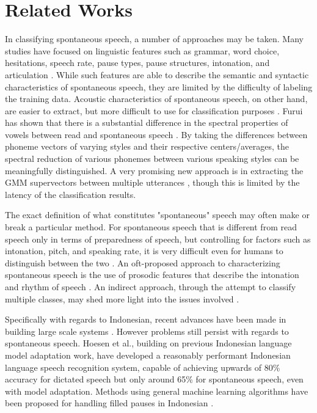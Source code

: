 \documentclass[conference]{IEEEtran}
\begin{document}
\section{Related Works}

In classifying spontaneous speech, a number of approaches may be taken.
Many studies have focused on linguistic features such as grammar, word choice, hesitations, speech rate, pause types, pause structures, intonation, and articulation \cite{barik}\cite{blaauw}\cite{umeda}.
While such features are able to describe the semantic and syntactic characteristics of spontaneous speech, they are limited by the difficulty of labeling the training data.
Acoustic characteristics of spontaneous speech, on other hand, are easier to extract, but more difficult to use for classification purposes \cite{nakamura}.
Furui has shown that there is a substantial difference in the spectral properties of vowels between read and spontaneous speech \cite{furui1}.
By taking the differences between phoneme vectors of varying styles and their respective centers/averages, the spectral reduction of various phonemes between various speaking styles can be meaningfully distinguished.
A very promising new approach is in extracting the GMM supervectors between multiple utterances \cite{asami}, though this is limited by the latency of the classification results.

The exact definition of what constitutes "spontaneous" speech may often make or break a particular method.
For spontaneous speech that is different from read speech only in terms of preparedness of speech, but controlling for factors such as intonation, pitch, and speaking rate, it is very difficult even for humans to distinguish between the two \cite{laan}.
An oft-proposed approach to characterizing spontaneous speech is the use of prosodic features that describe the intonation and rhythm of speech \cite{silverman}.
An indirect approach, through the attempt to classify multiple classes, may shed more light into the issues involved \cite{liu}.

Specifically with regards to Indonesian, recent advances have been made in building large scale systems \cite{lestari}\cite{sakti}.
However problems still persist with regards to spontaneous speech.
Hoesen et al., building on previous Indonesian language model adaptation work\cite{lestari2}, have developed a reasonably performant Indonesian language speech recognition system, capable of achieving upwards of 80\% accuracy for dictated speech but only around 65\% for spontaneous speech, even with model adaptation.
Methods using general machine learning algorithms have been proposed for handling filled pauses in Indonesian \cite{sani}.
\end{document}
